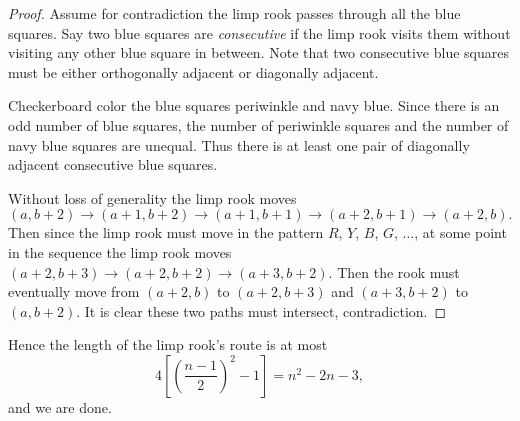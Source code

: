 \begin{proof}
    Assume for contradiction the limp rook passes through all the blue squares. Say two blue squares are \emph{consecutive} if the limp rook visits them without visiting any other blue square in between. Note that two consecutive blue squares must be either orthogonally adjacent or diagonally adjacent.

    Checkerboard color the blue squares periwinkle and navy blue. Since there is an odd number of blue squares, the number of periwinkle squares and the number of navy blue squares are unequal. Thus there is at least one pair of diagonally adjacent consecutive blue squares.
    \begin{center}
    \end{center}
    Without loss of generality the limp rook moves \[(a,b+2)\to(a+1,b+2)\to(a+1,b+1)\to(a+2,b+1)\to(a+2,b).\]
    Then since the limp rook must move in the pattern $R$, $Y$, $B$, $G$, $\ldots$, at some point in the sequence the limp rook moves $(a+2,b+3)\to(a+2,b+2)\to(a+3,b+2)$. Then the rook must eventually move from $(a+2,b)$ to $(a+2,b+3)$ and $(a+3,b+2)$ to $(a,b+2)$. It is clear these two paths must intersect, contradiction.
\end{proof}

Hence the length of the limp rook's route is at most \[4\left[\left(\frac{n-1}2\right)^2-1\right]=n^2-2n-3,\]
and we are done.

